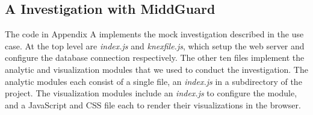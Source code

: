 \documentclass[midd]{thesis}
\begin{document}
\begin{landscape}
  \chapter{A Investigation with MiddGuard}

  \addtolength{\hoffset}{-2cm}
  \addtolength{\textheight}{2cm}

  \begin{multicols}{2}

    The code in Appendix A implements the mock investigation described in the
    use case. At the top level are \textit{index.js} and \textit{knexfile.js},
    which setup the web server and configure the database connection
    respectively. The other ten files implement the analytic and visualization
    modules that we used to conduct the investigation. The analytic modules each
    consist of a single file, an \textit{index.js} in a subdirectory of the
    project. The visualization modules include an \textit{index.js} to configure
    the module, and a JavaScript and CSS file each to render their
    visualizations in the browser.








  \end{multicols}

  \addtolength{\hoffset}{2cm}
  \addtolength{\textheight}{-2cm}
\end{landscape}
\end{document}
